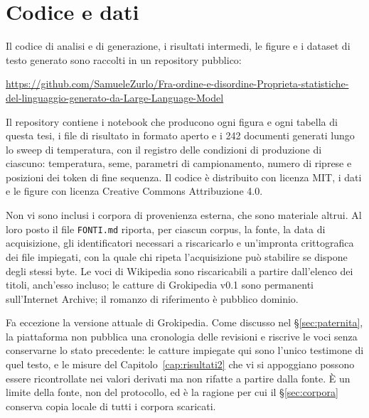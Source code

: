 
\chapter{Codice e dati}
\label{app:codice}

Il codice di analisi e di generazione, i risultati intermedi, le figure e i
dataset di testo generato sono raccolti in un repository pubblico:

\begin{center}
\footnotesize
\url{https://github.com/SamueleZurlo/Fra-ordine-e-disordine-Proprieta-statistiche-del-linguaggio-generato-da-Large-Language-Model}
\end{center}

\noindent
Il repository contiene i notebook che producono ogni figura e ogni tabella di
questa tesi, i file di risultato in formato aperto e i \num{242} documenti
generati lungo lo sweep di temperatura, con il registro delle condizioni di
produzione di ciascuno: temperatura, seme, parametri di campionamento, numero
di riprese e posizioni dei token di fine sequenza. Il codice è distribuito con
licenza MIT, i dati e le figure con licenza Creative Commons Attribuzione 4.0.

Non vi sono inclusi i corpora di provenienza esterna, che sono materiale
altrui. Al loro posto il file \texttt{FONTI.md} riporta, per ciascun corpus,
la fonte, la data di acquisizione, gli identificatori necessari a riscaricarlo
e un'impronta crittografica dei file impiegati, con la quale chi ripeta
l'acquisizione può stabilire se dispone degli stessi byte. Le voci di
Wikipedia sono riscaricabili a partire dall'elenco dei titoli, anch'esso
incluso; le catture di Grokipedia v0.1 sono permanenti sull'Internet Archive;
il romanzo di riferimento è pubblico dominio.

Fa eccezione la versione attuale di Grokipedia. Come discusso nel
§\ref{sec:paternita}, la piattaforma non pubblica una cronologia delle
revisioni e riscrive le voci senza conservarne lo stato precedente: le catture
impiegate qui sono l'unico testimone di quel testo, e le misure del
Capitolo~\ref{cap:risultati2} che vi si appoggiano possono essere ricontrollate
nei valori derivati ma non rifatte a partire dalla fonte. È un limite della
fonte, non del protocollo, ed è la ragione per cui il §\ref{sec:corpora}
conserva copia locale di tutti i corpora scaricati.
